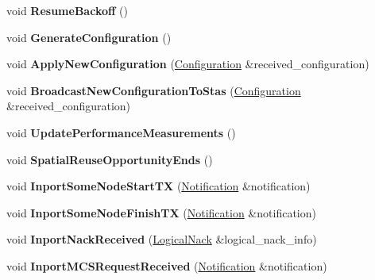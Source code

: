 \begin{DoxyCompactItemize}
void {\bfseries Resume\+Backoff} ()
\item 
\mbox{\label{classcompcxx__Node__23_a32e09622dbebfc1fbea719aae7525e0e}} 
void {\bfseries Generate\+Configuration} ()
\item 
\mbox{\label{classcompcxx__Node__23_a3306db08a96b24c2b18b923565977327}} 
void {\bfseries Apply\+New\+Configuration} (\hyperlink{structConfiguration}{Configuration} \&received\+\_\+configuration)
\item 
\mbox{\label{classcompcxx__Node__23_a898fb81b41186c9b37257375317d0f06}} 
void {\bfseries Broadcast\+New\+Configuration\+To\+Stas} (\hyperlink{structConfiguration}{Configuration} \&received\+\_\+configuration)
\item 
\mbox{\label{classcompcxx__Node__23_af66a3c1222c6c93d92bd775ed7e24e4c}} 
void {\bfseries Update\+Performance\+Measurements} ()
\item 
\mbox{\label{classcompcxx__Node__23_aa53c61968ec7ae05edccabd4258bec78}} 
void {\bfseries Spatial\+Reuse\+Opportunity\+Ends} ()
\item 
\mbox{\label{classcompcxx__Node__23_ab0debec7dfb78278f6d1bbcf280ac60b}} 
void {\bfseries Inport\+Some\+Node\+Start\+TX} (\hyperlink{structNotification}{Notification} \&notification)
\item 
\mbox{\label{classcompcxx__Node__23_a7c0d42252f3bbf3c44fc08622d833f91}} 
void {\bfseries Inport\+Some\+Node\+Finish\+TX} (\hyperlink{structNotification}{Notification} \&notification)
\item 
\mbox{\label{classcompcxx__Node__23_a02ad8fdaa360fec2c237204e6666b7d9}} 
void {\bfseries Inport\+Nack\+Received} (\hyperlink{structLogicalNack}{Logical\+Nack} \&logical\+\_\+nack\+\_\+info)
\item 
\mbox{\label{classcompcxx__Node__23_a5fda5f112eb592ff97616b6fcfcaed2a}} 
void {\bfseries Inport\+M\+C\+S\+Request\+Received} (\hyperlink{structNotification}{Notification} \&notification)

\end{DoxyCompactItemize}
